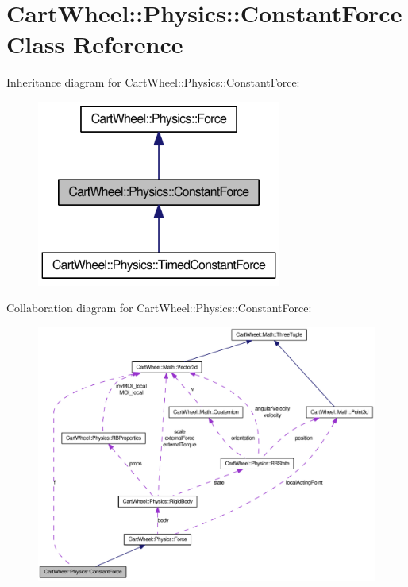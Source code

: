 \hypertarget{classCartWheel_1_1Physics_1_1ConstantForce}{
\section{CartWheel::Physics::ConstantForce Class Reference}
\label{classCartWheel_1_1Physics_1_1ConstantForce}
}


Inheritance diagram for CartWheel::Physics::ConstantForce:\nopagebreak
\begin{figure}[H]
\begin{center}
\leavevmode
\includegraphics[width=228pt]{classCartWheel_1_1Physics_1_1ConstantForce__inherit__graph}
\end{center}
\end{figure}


Collaboration diagram for CartWheel::Physics::ConstantForce:\nopagebreak
\begin{figure}[H]
\begin{center}
\leavevmode
\includegraphics[width=400pt]{classCartWheel_1_1Physics_1_1ConstantForce__coll__graph}
\end{center}
\end{figure}
